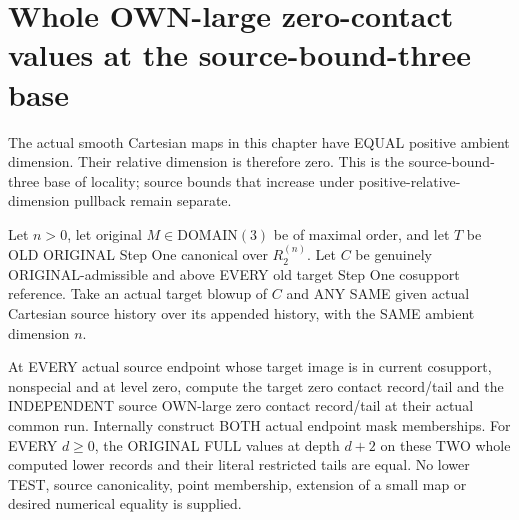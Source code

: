 \section{Whole OWN-large zero-contact values at the source-bound-three base}

The actual smooth Cartesian maps in this chapter have EQUAL positive
ambient dimension. Their relative dimension is therefore zero. This is
the source-bound-three base of locality; source bounds that increase
under positive-relative-dimension pullback remain separate.

\begin{theorem}
\label{hir:original-prepared-bound-three-zero-own-large-etale-values}
\leanok
Let $n>0$, let original $M\in\mathrm{DOMAIN}(3)$ be of maximal order,
and let $T$ be OLD ORIGINAL Step One canonical over $R^{(n)}_2$.
Let $C$ be genuinely ORIGINAL-admissible and above EVERY old target
Step One cosupport reference. Take an actual target blowup of $C$ and
ANY SAME given actual Cartesian source history over its appended
history, with the SAME ambient dimension $n$.

At EVERY actual source endpoint whose target image is in current
cosupport, nonspecial and at level zero, compute the target zero
contact record/tail and the INDEPENDENT source OWN-large zero contact
record/tail at their actual common run. Internally construct BOTH
actual endpoint mask memberships. For EVERY $d\geq0$, the ORIGINAL
FULL values at depth $d+2$ on these TWO whole computed lower records
and their literal restricted tails are equal. No lower TEST, source
canonicality, point membership, extension of a small map or desired
numerical equality is supplied.
\end{theorem}
